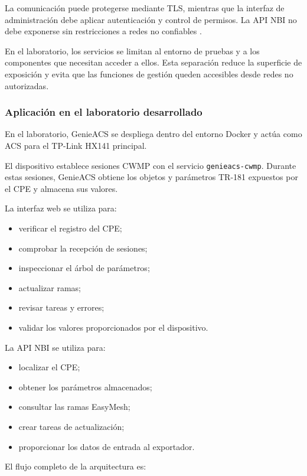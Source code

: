 La comunicación puede protegerse mediante TLS, mientras que la interfaz
de administración debe aplicar autenticación y control de permisos. La
API NBI no debe exponerse sin restricciones a redes no confiables
\cite{genieacs_documentation}.

En el laboratorio, los servicios se limitan al entorno de pruebas y a los
componentes que necesitan acceder a ellos. Esta separación reduce la
superficie de exposición y evita que las funciones de gestión queden
accesibles desde redes no autorizadas.


\subsubsection*{Aplicación en el laboratorio desarrollado}

En el laboratorio, GenieACS se despliega dentro del entorno Docker y
actúa como ACS para el TP-Link HX141 principal.

El dispositivo establece sesiones CWMP con el servicio
\texttt{genieacs-cwmp}. Durante estas sesiones, GenieACS obtiene los
objetos y parámetros TR-181 expuestos por el CPE y almacena sus valores.

La interfaz web se utiliza para:

\begin{itemize}
    \item verificar el registro del CPE;
    \item comprobar la recepción de sesiones;
    \item inspeccionar el árbol de parámetros;
    \item actualizar ramas;
    \item revisar tareas y errores;
    \item validar los valores proporcionados por el dispositivo.
\end{itemize}

La API NBI se utiliza para:

\begin{itemize}
    \item localizar el CPE;
    \item obtener los parámetros almacenados;
    \item consultar las ramas EasyMesh;
    \item crear tareas de actualización;
    \item proporcionar los datos de entrada al exportador.
\end{itemize}

El flujo completo de la arquitectura es:

